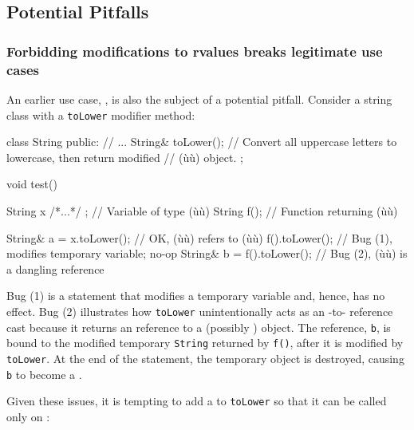 \subsection[Potential Pitfalls]{Potential Pitfalls}\label{potential-pitfalls-refqualifer}

\subsubsection[Forbidding modifications to \romeovalue{rvalues} breaks legitimate use cases]{Forbidding modifications to {\sfbsubsubsecitalRomeo rvalues} breaks legitimate use cases}\label{forbidding-modifications-to-rvalues-breaks-legitimate-use-cases}

An earlier use case, , is
also the subject of a potential pitfall. Consider a string class with a
\lstinline!toLower! modifier method:

\begin{emcppslisting}
class String
{
public:
    // ...
    String& toLower();
        // Convert all uppercase letters to lowercase, then return modified
        // (ù{}ù) object.
};

void test()
{
    String x{ /*...*/ };  // Variable of type (ù{}ù)
    String f();           // Function returning (ù{}ù)
  
    String& a = x.toLower();    // OK, (ù{}ù) refers to (ù{}ù)
    f().toLower();              // Bug (1), modifies temporary variable; no-op
    String& b = f().toLower();  // Bug (2), (ù{}ù) is a dangling reference
}
\end{emcppslisting}
    

\noindent Bug (1) is a statement that modifies a temporary variable and, hence,
has no effect. Bug (2) illustrates how \lstinline!toLower! unintentionally
acts as an -to- reference cast because it
returns an  reference to a (possibly ) object.
The  reference, \lstinline!b!, is bound to the modified
temporary \lstinline!String! returned by \lstinline!f()!, after it is modified
by \lstinline!toLower!. At the end of the statement, the temporary object
is destroyed, causing \lstinline!b! to become a .

Given these issues, it is tempting to add a  to
\lstinline!toLower! so that it can be called only on :

